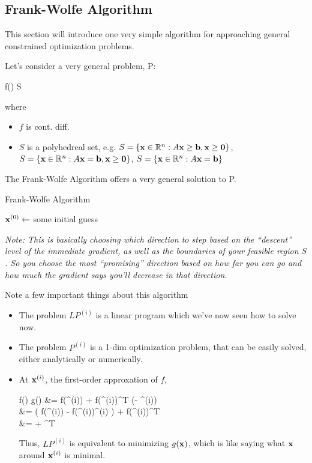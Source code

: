 \subsection{Frank-Wolfe Algorithm}
This section will introduce one very simple algorithm for approaching general
constrained optimization problems.

Let's consider a very general problem, P:
\begin{frml}
	\min f(\vx) \st \vx \in S
\end{frml}
where
\begin{itemize}
	\item $f$ is cont. diff.
	\item $S$ is a polyhedreal set, e.g.
$S = \{ \mathbf{x} \in \mathbb{R}^n : A\mathbf{x} \geq \mathbf{b}, \mathbf{x} \geq \mathbf{0} \}$,
$S = \{ \mathbf{x} \in \mathbb{R}^n : A\mathbf{x} = \mathbf{b}, \mathbf{x} \geq \mathbf{0} \}$,
$S = \{ \mathbf{x} \in \mathbb{R}^n : A\mathbf{x} = \mathbf{b}\}$
\end{itemize}

The Frank-Wolfe Algorithm offers a very general solution to P.
\begin{algorithm}
\caption{Frank-Wolfe Algorithm}
$\mathbf{x}^{(0)} \leftarrow $ some initial guess \;
	
\end{algorithm}
\textit{Note: This is basically choosing which direction to step based on the ``descent'' level of the
immediate gradient, as well as the boundaries of your feasible region $S$.
So you choose the most ``promising'' direction based on how far you can go
and how much the gradient says you'll decrease in that direction.}

Note a few important things about this algorithm 
\begin{itemize}
	\item The problem $LP^{(i)}$ is a linear program which we've now seen how 
		to solve now.
	\item The problem $P^{(i)}$ is a 1-dim optimization problem, that can be 
		easily solved, either analytically or numerically.
	\item At $\mathbf{x}^{(i)}$, the first-order approxation of $f$, 
		\begin{frml}
			f(\vx) \approx g(\vx)
		&= f(\vx^{(i)}) + \nabla f(\vx^{(i)})^T (\vx - \vx^{(i)}) \\
		&= 
		\bigg( f(\vx^{(i)}) - \nabla f(\vx^{(i)})\vx^{(i)} \bigg) 
		+ \nabla f(\vx^{(i)})^T\vx \\
		&=  + \vc^T\vx 
	\end{frml}
	Thus, $LP^{(i)}$ is equivalent to minimizing $g(\mathbf{x})$, which is like saying
	what $\mathbf{x}$ around $\mathbf{x}^{(i)}$ is minimal.
\end{itemize}


